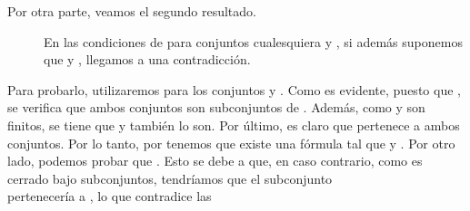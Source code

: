 \begin{isabellebody}
\begin{isamarkuptext}
\begin{demostracion}
  Por otra parte, veamos el segundo resultado. 

  \begin{description}
    \item[\isa{{\isasymtwo}{\isacharparenright}}] En las condiciones de \isa{{\isasymone}{\isacharparenright}} para conjuntos cualesquiera  y , si además 
    suponemos que  y , llegamos a una contradicción. 
  \end{description}

  Para probarlo, utilizaremos \isa{{\isasymone}{\isacharparenright}} para los conjuntos  y . Como es evidente, 
  puesto que , se verifica que ambos conjuntos son subconjuntos de . Además, como  y 
   son finitos, se tiene que  y  también lo son. Por último, es claro que 
   pertenece a ambos conjuntos. Por lo tanto, por \isa{{\isasymone}{\isacharparenright}} tenemos que existe una fórmula 
   tal que  y . Por otro lado, podemos probar 
  que . Esto se debe a que, en caso contrario, como  es cerrado bajo 
  subconjuntos, tendríamos que el subconjunto\\  pertenecería a , lo que contradice las 

\end{demostracion}
\end{isamarkuptext}
\end{isabellebody}
